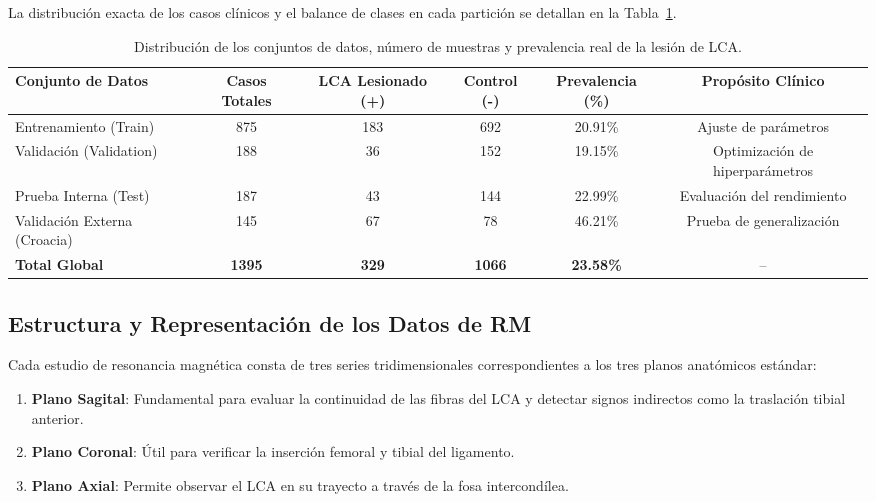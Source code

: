 La distribución exacta de los casos clínicos y el balance de clases en cada partición se detallan en la Tabla~\ref{tab:distribucion_datos}.

\begin{table}[htbp]
\centering
\caption{Distribución de los conjuntos de datos, número de muestras y prevalencia real de la lesión de LCA.}
\label{tab:distribucion_datos}
\begin{tabular}{lccccc}
\hline
\textbf{Conjunto de Datos} & \textbf{Casos Totales} & \textbf{LCA Lesionado (+)} & \textbf{Control (-)} & \textbf{Prevalencia (\%)} & \textbf{Propósito Clínico} \\ \hline
Entrenamiento (Train)      & 875                    & 183                        & 692                  & 20.91\%                    & Ajuste de parámetros \\
Validación (Validation)    & 188                    & 36                         & 152                  & 19.15\%                    & Optimización de hiperparámetros \\
Prueba Interna (Test)      & 187                    & 43                         & 144                  & 22.99\%                    & Evaluación del rendimiento \\
Validación Externa (Croacia)& 145                    & 67                         & 78                   & 46.21\%                    & Prueba de generalización \\ \hline
\textbf{Total Global}      & \textbf{1395}          & \textbf{329}               & \textbf{1066}        & \textbf{23.58\%}           & -- \\ \hline
\end{tabular}
\end{table}


\subsection{Estructura y Representación de los Datos de RM}
Cada estudio de resonancia magnética consta de tres series tridimensionales correspondientes a los tres planos anatómicos estándar:
\begin{enumerate}
    \item \textbf{Plano Sagital}: Fundamental para evaluar la continuidad de las fibras del LCA y detectar signos indirectos como la traslación tibial anterior.
    \item \textbf{Plano Coronal}: Útil para verificar la inserción femoral y tibial del ligamento.
    \item \textbf{Plano Axial}: Permite observar el LCA en su trayecto a través de la fosa intercondílea.
\end{enumerate}

